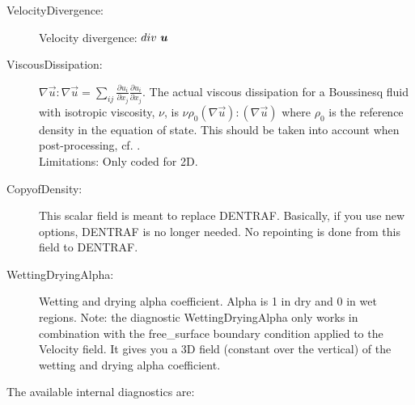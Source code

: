 \begin{description}
\item[VelocityDivergence:]Velocity divergence: $div \mbox{ \vec{u}}$
\item[ViscousDissipation:] $\nabla \vec{u} : \nabla \vec{u} = \sum _{ij}\frac{\partial u_i}{\partial x_j}\frac{\partial u_i}{\partial x_j}$. The actual viscous dissipation for a Boussinesq fluid with isotropic viscosity, $\nu$, is $\nu \rho_0 (\nabla \vec{u}):(\nabla \vec{u})$ where $\rho_0$ is the reference density in the equation of state. This should be taken into account when post-processing, cf. \cite{winters1995}. \\
Limitations: Only coded for 2D.
\item[CopyofDensity:]This scalar field is meant to replace DENTRAF. Basically, if you use new options, DENTRAF is no longer needed. No repointing is done from this field to DENTRAF.
\item[WettingDryingAlpha:]Wetting and drying alpha coefficient. Alpha is 1 in dry and 0 in wet regions. Note: the diagnostic WettingDryingAlpha only works in combination with the free\_surface boundary condition applied to the Velocity field. It gives you a 3D field (constant over the vertical) of the wetting and drying alpha coefficient.
\end{description}

The available internal   diagnostics are:


